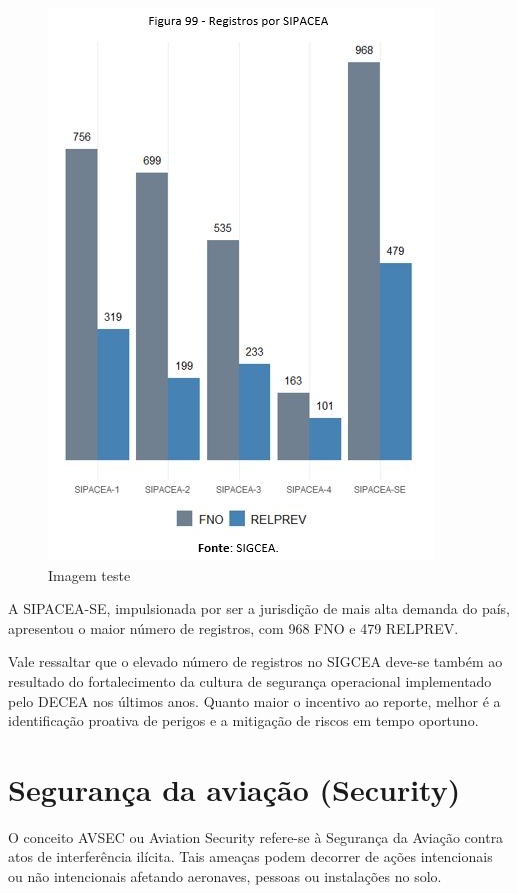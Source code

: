 \documentclass[
]{book}
\begin{document}
\begin{figure}
\centering
\includegraphics{imagens/fig86.jpg}
\caption{Imagem teste}
\end{figure}

A SIPACEA-SE, impulsionada por ser a jurisdição de mais alta demanda do país, apresentou o maior número de registros, com 968 FNO e 479 RELPREV.

Vale ressaltar que o elevado número de registros no SIGCEA deve-se também ao resultado do fortalecimento da cultura de segurança operacional implementado pelo DECEA nos últimos anos. Quanto maior o incentivo ao reporte, melhor é a identificação proativa de perigos e a mitigação de riscos em tempo oportuno.

\hypertarget{seguranuxe7a-da-aviauxe7uxe3o-security}{%
\section{Segurança da aviação (Security)}\label{seguranuxe7a-da-aviauxe7uxe3o-security}}

O conceito AVSEC ou Aviation Security refere-se à Segurança da Aviação contra atos de interferência ilícita. Tais ameaças podem decorrer de ações intencionais ou não intencionais afetando aeronaves, pessoas ou instalações no solo.
\end{document}
